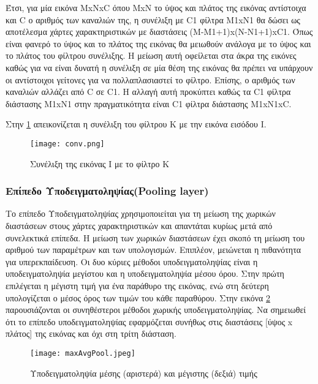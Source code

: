  
Έτσι, για μία εικόνα MxNxC όπου MxN το ύψος και πλάτος της εικόνας αντίστοιχα και C ο αριθμός των καναλιών της, η συνέλιξη με C1 φίλτρα M1xN1 θα δώσει ως αποτέλεσμα χάρτες χαρακτηριστικών με διαστάσεις (Μ-Μ1+1)x(N-N1+1)xC1. Όπως είναι φανερό το ύψος και το πλάτος της εικόνας θα μειωθούν ανάλογα με το ύψος και το πλάτος του φίλτρου συνέλιξης. Η μείωση αυτή οφείλεται στα άκρα της εικόνες καθώς για να είναι δυνατή η συνέλιξη σε μία θέση της εικόνας θα πρέπει να υπάρχουν οι αντίστοιχοι γείτονες για να πολλαπλασιαστεί το φίλτρο. Επίσης, ο αριθμός των καναλιών αλλάζει από C σε C1. Η αλλαγή αυτή προκύπτει καθώς τα C1 φίλτρα διάστασης M1xN1 στην πραγματικότητα είναι C1 φίλτρα διάστασης M1xN1xC.




Στην \ref{figure:conv} απεικονίζεται η συνέλιξη του φίλτρου Κ με την εικόνα εισόδου I.


\begin{figure}[!h]
    \centering
      \texttt{[image: conv.png]} \caption{Συνέλιξη της εικόνας I με το φίλτρο K}
\label{figure:conv}  
\end{figure}


\subsubsection{Επίπεδο Υποδειγματοληψίας(Pooling layer)}
\label{subsubsec:3.1.3.2}


Το επίπεδο Υποδειγματοληψίας χρησιμοποιείται για τη μείωση της χωρικών διαστάσεων στους χάρτες χαρακτηριστικών και απαντάται κυρίως μετά από συνελεκτικά επίπεδα. Η μείωση των χωρικών διαστάσεων έχει σκοπό τη μείωση του αριθμού των παραμέτρων και των υπολογισμών. Επιπλέον, μειώνεται η πιθανότητα για  υπερεκπαίδευση. Οι δυο κύριες μέθοδοι υποδειγματοληψίας είναι η υποδειγματοληψία μεγίστου και η υποδειγματοληψία μέσου όρου. Στην πρώτη επιλέγεται η μέγιστη τιμή για ένα παράθυρο της εικόνας, ενώ στη δεύτερη υπολογίζεται ο μέσος όρος των τιμών του κάθε παραθύρου. Στην εικόνα \ref{figure:maxAvgPool} παρουσιάζονται οι  συνηθέστεροι μέθοδοι χωρικής υποδειγματοληψίας. Να σημειωθεί ότι το επίπεδο υποδειγματοληψίας εφαρμόζεται συνήθως στις διαστάσεις [ύψος x πλάτος] της εικόνας και όχι στη τρίτη διάσταση.



\begin{figure}[!h]
    \centering
      \texttt{[image: maxAvgPool.jpeg]} \caption{Υποδειγματοληψία μέσης (αριστερά) και μέγιστης (δεξιά) τιμής}
      \label{figure:maxAvgPool}    
  \end{figure}


